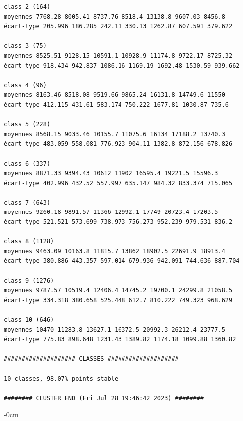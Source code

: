 \documentclass[earth,article,submit,pdftex,moreauthors]{Definitions/mdpi}
\begin{document}
\begin{scriptsize}
\begin{verbatim}
class 2 (164)
moyennes 7768.28 8005.41 8737.76 8518.4 13138.8 9607.03 8456.8
écart-type 205.996 186.285 242.11 330.13 1262.87 607.591 379.622

class 3 (75)
moyennes 8525.51 9128.15 10591.1 10928.9 11174.8 9722.17 8725.32
écart-type 918.434 942.837 1086.16 1169.19 1692.48 1530.59 939.662

class 4 (96)
moyennes 8163.46 8518.08 9519.66 9865.24 16131.8 14749.6 11550
écart-type 412.115 431.61 583.174 750.222 1677.81 1030.87 735.6

class 5 (228)
moyennes 8568.15 9033.46 10155.7 11075.6 16134 17188.2 13740.3
écart-type 483.059 558.081 776.923 904.11 1382.8 872.156 678.826

class 6 (337)
moyennes 8871.33 9394.43 10612 11902 16595.4 19221.5 15596.3
écart-type 402.996 432.52 557.997 635.147 984.32 833.374 715.065

class 7 (643)
moyennes 9260.18 9891.57 11366 12992.1 17749 20723.4 17203.5
écart-type 521.521 573.699 738.973 756.273 952.239 979.531 836.2

class 8 (1128)
moyennes 9463.09 10163.8 11815.7 13862 18902.5 22691.9 18913.4
écart-type 380.886 443.357 597.014 679.936 942.091 744.636 887.704

class 9 (1276)
moyennes 9787.57 10519.4 12406.4 14745.2 19700.1 24299.8 21058.5
écart-type 334.318 380.658 525.448 612.7 810.222 749.323 968.629

class 10 (646)
moyennes 10470 11283.8 13627.1 16372.5 20992.3 26212.4 23777.5
écart-type 775.83 898.648 1231.43 1389.82 1174.18 1099.88 1360.82

#################### CLASSES ####################

10 classes, 98.07% points stable

######## CLUSTER END (Fri Jul 28 19:46:42 2023) ########

\end{verbatim}
\end{scriptsize}

\begin{adjustwidth}{-\extralength}{0cm}




\end{adjustwidth}
\end{document}
